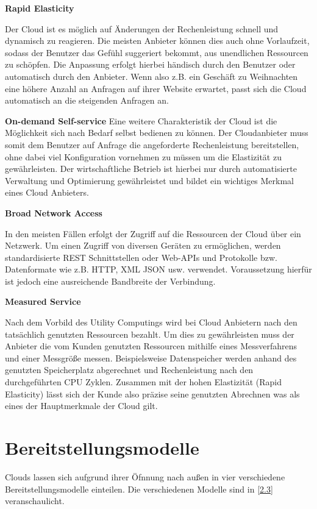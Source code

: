 \textbf{Rapid Elasticity}

Der Cloud ist es möglich auf Änderungen der Rechenleistung schnell und dynamisch zu reagieren. Die meisten Anbieter können dies auch ohne Vorlaufzeit, sodass der Benutzer das Gefühl suggeriert bekommt, aus unendlichen Ressourcen zu schöpfen. Die Anpassung erfolgt hierbei händisch durch den Benutzer oder automatisch durch den Anbieter. Wenn also z.B. ein Geschäft zu Weihnachten eine höhere Anzahl an Anfragen auf ihrer Website erwartet, passt sich die Cloud automatisch an die steigenden Anfragen an. \cite*[]{DAAS}
   
\textbf{On-demand Self-service}
Eine weitere Charakteristik der Cloud ist die Möglichkeit sich nach Bedarf selbst bedienen  zu können. Der Cloudanbieter muss somit dem Benutzer auf Anfrage die angeforderte Rechenleistung bereitstellen, ohne dabei viel Konfiguration vornehmen zu müssen um die Elastizität zu gewährleisten. Der wirtschaftliche Betrieb ist hierbei nur durch automatisierte Verwaltung und Optimierung gewährleistet und bildet ein wichtiges Merkmal eines Cloud Anbieters. \cite*[]{DAAS}
    
\textbf{Broad Network Access}

In den meisten Fällen erfolgt der Zugriff auf die Ressourcen der Cloud über ein Netzwerk. Um einen Zugriff von diversen Geräten zu ermöglichen, werden standardisierte REST Schnittstellen oder Web-APIs und Protokolle bzw. Datenformate wie z.B. HTTP, XML JSON usw. verwendet. Voraussetzung hierfür ist jedoch eine ausreichende Bandbreite der Verbindung. \cite*[]{DAAS}

\textbf{Measured Service}

Nach dem Vorbild des Utility Computings wird bei Cloud Anbietern nach den tatsächlich genutzten Ressourcen bezahlt. Um dies zu gewährleisten muss der Anbieter die vom Kunden genutzten Ressourcen mithilfe eines Messverfahrens und einer Messgröße messen. Beispielsweise Datenspeicher werden anhand des genutzten Speicherplatz abgerechnet und Rechenleistung nach den durchgeführten CPU Zyklen. Zusammen mit der hohen Elastizität (Rapid Elasticity) lässt sich der Kunde also präzise seine  genutzten Abrechnen was als eines der Hauptmerkmale der Cloud gilt. \cite*[]{Break}

\section{Bereitstellungsmodelle}
Clouds lassen sich aufgrund ihrer Öfnnung nach außen in vier verschiedene Bereitstellungsmodelle einteilen. Die verschiedenen Modelle sind in \autoref{2.3} veranschaulicht.

